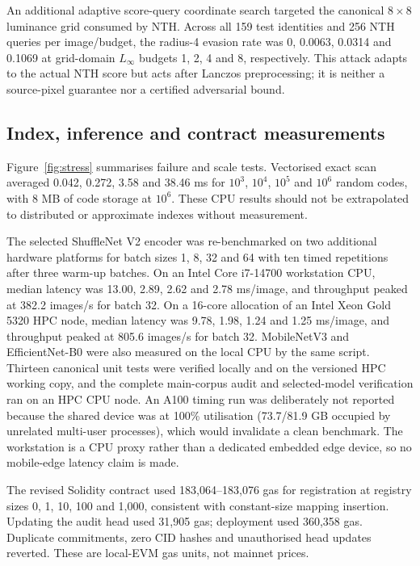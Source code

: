 \documentclass[12pt]{article}
\begin{document}
An additional adaptive score-query coordinate search targeted the canonical $8\times8$ luminance grid consumed by NTH. Across all 159 test identities and 256 NTH queries per image/budget, the radius-4 evasion rate was 0, 0.0063, 0.0314 and 0.1069 at grid-domain $L_\infty$ budgets 1, 2, 4 and 8, respectively. This attack adapts to the actual NTH score but acts after Lanczos preprocessing; it is neither a source-pixel guarantee nor a certified adversarial bound.

\subsection{Index, inference and contract measurements}

Figure~\ref{fig:stress} summarises failure and scale tests. Vectorised exact scan averaged 0.042, 0.272, 3.58 and 38.46 ms for $10^3$, $10^4$, $10^5$ and $10^6$ random codes, with 8 MB of code storage at $10^6$. These CPU results should not be extrapolated to distributed or approximate indexes without measurement.

The selected ShuffleNet V2 encoder was re-benchmarked on two additional hardware platforms for batch sizes 1, 8, 32 and 64 with ten timed repetitions after three warm-up batches. On an Intel Core i7-14700 workstation CPU, median latency was 13.00, 2.89, 2.62 and 2.78 ms/image, and throughput peaked at 382.2 images/s for batch 32. On a 16-core allocation of an Intel Xeon Gold 5320 HPC node, median latency was 9.78, 1.98, 1.24 and 1.25 ms/image, and throughput peaked at 805.6 images/s for batch 32. MobileNetV3 and EfficientNet-B0 were also measured on the local CPU by the same script. Thirteen canonical unit tests were verified locally and on the versioned HPC working copy, and the complete main-corpus audit and selected-model verification ran on an HPC CPU node. An A100 timing run was deliberately not reported because the shared device was at 100\% utilisation (73.7/81.9 GB occupied by unrelated multi-user processes), which would invalidate a clean benchmark. The workstation is a CPU proxy rather than a dedicated embedded edge device, so no mobile-edge latency claim is made.

The revised Solidity contract used 183,064--183,076 gas for registration at registry sizes 0, 1, 10, 100 and 1,000, consistent with constant-size mapping insertion. Updating the audit head used 31,905 gas; deployment used 360,358 gas. Duplicate commitments, zero CID hashes and unauthorised head updates reverted. These are local-EVM gas units, not mainnet prices.
\end{document}
